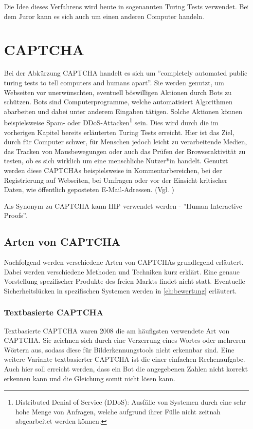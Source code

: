 Die Idee dieses Verfahrens wird heute in sogenannten Turing Tests verwendet.
Bei dem Juror kann es sich auch um einen anderen Computer handeln.

\pagebreak

\section{CAPTCHA}
\label{ch:basics:captcha}
Bei der Abkürzung CAPTCHA handelt es sich um ''completely automated public turing tests to tell computers and humans apart''. 
Sie werden genutzt, um Webseiten vor unerwünschten, eventuell böswilligen Aktionen durch Bots zu schützen. 
Bots sind Computerprogramme, welche automatisiert Algorithmen abarbeiten und dabei unter anderem Eingaben tätigen.
Solche Aktionen können beispielsweise Spam- oder 
DDoS-Attacken\footnote[1]{Distributed Denial of Service (DDoS): Ausfälle von Systemen durch eine sehr hohe Menge von Anfragen, 
welche aufgrund ihrer Fülle nicht zeitnah abgearbeitet werden können.} sein.
Dies wird durch die im vorherigen Kapitel bereits erläuterten Turing Tests erreicht. 
Hier ist das Ziel, durch für Computer schwer, für Menschen jedoch leicht zu verarbeitende Medien, das Tracken von Mausbewegungen
oder auch das Prüfen der Browseraktivität zu testen, ob es sich wirklich um eine menschliche Nutzer*in handelt.
Genutzt werden diese CAPTCHAs beispielsweise in Kommentarbereichen, bei der Registrierung auf Webseiten,
bei Umfragen oder vor der Einsicht kritischer Daten, wie öffentlich geposteten E-Mail-Adressen. (Vgl. \cite{moradi})

Als Synonym zu CAPTCHA kann HIP verwendet werden - ''Human Interactive Proofs''. 

\subsection{Arten von CAPTCHA}
\label{ch:basics:captcha:arten}
Nachfolgend werden verschiedene Arten von CAPTCHAs grundlegend erläutert.
Dabei werden verschiedene Methoden und Techniken kurz erklärt. 
Eine genaue Vorstellung spezifischer Produkte des freien Markts findet nicht statt.
Eventuelle Sicherheitslücken in spezifischen Systemen werden in \autoref{ch:bewertung} erläutert.

\subsubsection*{Textbasierte CAPTCHA}
Textbasierte CAPTCHA waren 2008 die am häufigsten verwendete Art von CAPTCHA.
Sie zeichnen sich durch eine Verzerrung eines Wortes oder mehreren Wörtern aus, sodass diese für Bilderkennungstools nicht erkennbar sind.
Eine weitere Variante textbasierter CAPTCHA ist die einer einfachen Rechenaufgabe. 
Auch hier soll erreicht werden, dass ein Bot die angegebenen Zahlen nicht korrekt erkennen kann und die Gleichung somit nicht lösen kann. \cite[p.1]{usabilityofcaptchas} \cite[p.75]{surveyofresearch} \cite{shinde2018DIFFERENTTO} %

